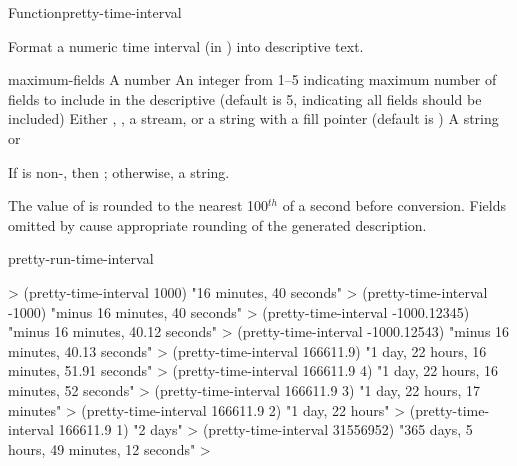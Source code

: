 \documentclass[10pt,twoside,english,pdftex]{article}
\begin{document}
\begin{functiondoc}{Function}{pretty-time-interval}{%
      
    \returns{} }
% 

\fnsyntax

\fnpurpose Format a numeric time interval (in ) into
descriptive text.

\fnpackage {}

\fnmodule {}

\fnargs
\begin{args}{maximum-fields}
\arg[seconds] A number
 An integer from 1--5 indicating maximum number of fields 
to include in the descriptive  (default is 5, indicating all 
fields should be included)
\arg[destination] Either \nil, , a stream, or a string with a fill 
pointer (default is \nil)
\arg[result] A string or \nil{}
\end{args}

\fnreturns If  is non-\nil, then \nil; otherwise, a string.

\fndescription The value of  is rounded to the nearest
100$^{th}$ of a second before conversion.  Fields omitted by
 cause appropriate rounding of the generated
description.

\begin{alsos}{pretty-run-time-interval}
\end{alsos}

\fnexamples
%
\W\supp
\begin{example}
  > (pretty-time-interval 1000)
  "16 minutes, 40 seconds"
  > (pretty-time-interval -1000)
  "minus 16 minutes, 40 seconds"
  > (pretty-time-interval -1000.12345)
  "minus 16 minutes, 40.12 seconds"
  > (pretty-time-interval -1000.12543)
  "minus 16 minutes, 40.13 seconds"\goodpagebreak
  > (pretty-time-interval 166611.9)
  "1 day, 22 hours, 16 minutes, 51.91 seconds"
  > (pretty-time-interval 166611.9 4)
  "1 day, 22 hours, 16 minutes, 52 seconds"
  > (pretty-time-interval 166611.9 3)
  "1 day, 22 hours, 17 minutes"
  > (pretty-time-interval 166611.9 2)
  "1 day, 22 hours"
  > (pretty-time-interval 166611.9 1)
  "2 days"
  > (pretty-time-interval 31556952)
  "365 days, 5 hours, 49 minutes, 12 seconds"
  >
\end{example}

\end{functiondoc}
\end{document}
